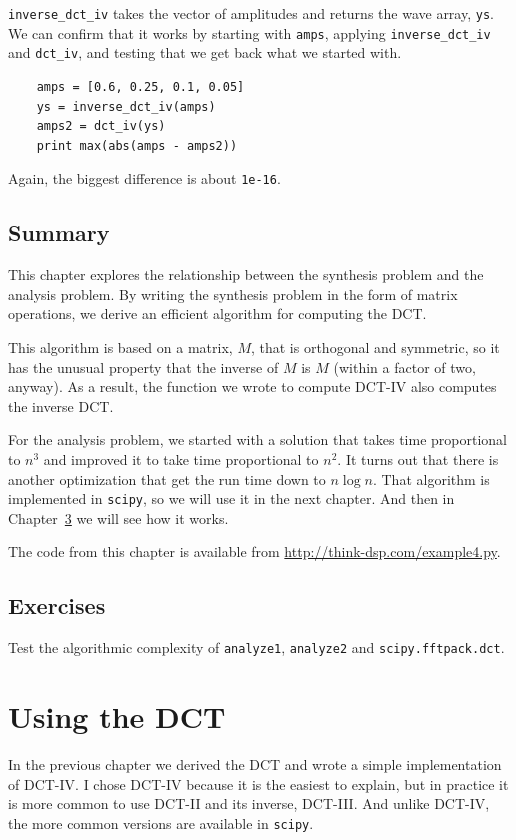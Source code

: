 \documentclass[12pt]{book}
\begin{document}
\verb"inverse_dct_iv" takes the vector of amplitudes and returns
the wave array, {\tt ys}.  We can confirm that it works by starting
with {\tt amps}, applying \verb"inverse_dct_iv" and \verb"dct_iv",
and testing that we get back what we started with.

\begin{verbatim}
    amps = [0.6, 0.25, 0.1, 0.05]
    ys = inverse_dct_iv(amps)
    amps2 = dct_iv(ys)
    print max(abs(amps - amps2))
\end{verbatim}

Again, the biggest difference is about {\tt 1e-16}.


\section{Summary}

This chapter explores the relationship between the synthesis problem
and the analysis problem.  By writing the synthesis problem in the
form of matrix operations, we derive an efficient algorithm for computing
the DCT.

This algorithm is based on a matrix, $M$, that is orthogonal and
symmetric, so it has the unusual property that the inverse of $M$ is
$M$ (within a factor of two, anyway).  As a result, the function we
wrote to compute DCT-IV also computes the inverse DCT.

For the analysis problem, we started with a solution that
takes time proportional to $n^3$ and improved it to take time
proportional to $n^2$.  It turns out that there is another optimization
that get the run time down to $n \log n$.  That algorithm is implemented
in {\tt scipy}, so we will use it in the next chapter.  And then in
Chapter~\ref{} we will see how it works.

The code from this chapter is available from
\url{http://think-dsp.com/example4.py}.





\section{Exercises}

\begin{exercise}
Test the algorithmic complexity of {\tt analyze1}, {\tt analyze2}
and {\tt scipy.fftpack.dct}.
\end{exercise}


\chapter{Using the DCT}

In the previous chapter we derived the DCT and wrote a simple
implementation of DCT-IV.  I chose DCT-IV because it is the
easiest to explain, but in practice it is more common to use
DCT-II and its inverse, DCT-III.  And unlike DCT-IV, the more
common versions are available in {\tt scipy}.
\end{document}
